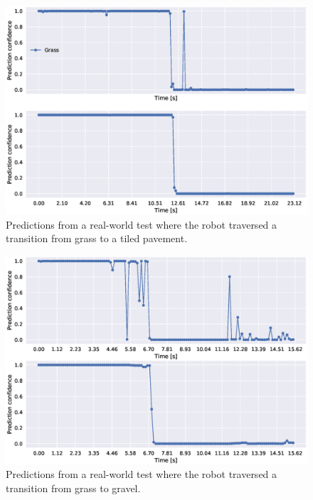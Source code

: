 \begin{figure}
	\centering
	\includegraphics[scale=0.5]{figs_temp/transition_grass_tiles_grass}
	\caption{Predictions from a real-world test where the robot traversed a transition from grass to a tiled pavement.} 
	\label{fig:trans_tgtg}
\end{figure}

\begin{figure}
	\centering
	\includegraphics[scale=0.5]{figs_temp/transition_grass_gravel2}
	\caption{Predictions from a real-world test where the robot traversed a transition from grass to gravel.}
	\label{fig:trans_gg}
\end{figure}


